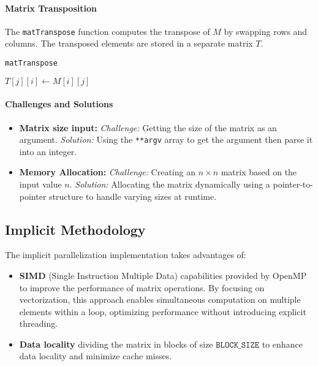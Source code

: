 \documentclass[conference]{IEEEtran}
\begin{document}
\paragraph{Matrix Transposition}  
The \texttt{matTranspose} function computes the transpose of \( M \) by swapping rows and columns. The transposed elements are stored in a separate matrix \( T \).
\begin{algorithm}
\caption{\texttt{matTranspose}}
\begin{algorithmic}[1]
        \State $T[j][i] \gets M[i][j]$
    \EndFor
\EndFor
\end{algorithmic}
\end{algorithm}

\paragraph{Challenges and Solutions}
\begin{itemize}
    \item \textbf{Matrix size input:}  
    \textit{Challenge:} Getting the size of the matrix as an argument.
    \textit{Solution:} Using the \texttt{**argv} array to get the argument then parse it into an integer.
    \item \textbf{Memory Allocation:}  
    \textit{Challenge:} Creating an \( n \times n \) matrix based on the input value \( n \).  
    \textit{Solution:} Allocating the matrix dynamically using a pointer-to-pointer structure to handle varying sizes at runtime. 
\end{itemize}

\subsection{Implicit Methodology}
The implicit parallelization implementation takes advantages of:\begin{itemize}\item \textbf{SIMD} (Single Instruction Multiple Data) capabilities provided by OpenMP to improve the performance of matrix operations. By focusing on vectorization, this approach enables simultaneous computation on multiple elements within a loop, optimizing performance without introducing explicit threading. 
\item \textbf{Data locality}
dividing the matrix in blocks of size \( \texttt{BLOCK\_SIZE} \) to enhance data locality and minimize cache misses. 
\end{itemize}
\end{document}
